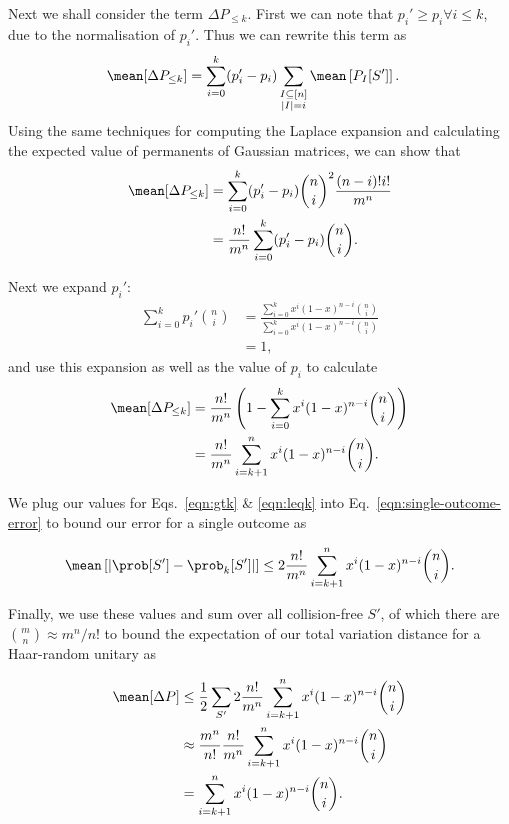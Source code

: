 Next we shall consider the term $\Delta P_{\leq k}$. 
First we can note that $p_i' \geq p_i \forall i\leq k$, due to the normalisation of $p_i'$. 
Thus we can rewrite this term as
\begin{align}
\mean[\Delta P_{\leq k}] &= \sum_{i=0}^k(p_i'-p_i)\sum_{\substack{I\subseteq[n]\\|I|=i}}\mean\left[P_I[S']\right].
\end{align}
Using the same techniques for computing the Laplace expansion and calculating the expected value of permanents of Gaussian matrices, we can show that
\begin{align}
\mean[\Delta P_{\leq k}] &= \sum_{i=0}^k(p_i'-p_i)\binom{n}{i}^2\frac{(n-i)!i!}{m^n}\\
&= \frac{n!}{m^n}\sum_{i=0}^k(p_i'-p_i)\binom{n}{i}\label{eqn:gtk}.
\end{align}

Next we expand $p_i'$:
\begin{align}
\sum_{i=0}^kp_i'\binom{n}{i} &= \frac{\sum_{i=0}^kx^i(1-x)^{n-i}\binom{n}{i}}{\sum_{i=0}^kx^i(1-x)^{n-i}\binom{n}{i}}\\
&= 1,
\end{align}
and use this expansion as well as the value of $p_i$ to calculate
\begin{align}
\mean[\Delta P_{\leq k}] &= \frac{n!}{m^n}\left(1 - \sum_{i=0}^kx^i(1-x)^{n-i}\binom{n}{i}\right)\\
&= \frac{n!}{m^n}\sum_{i=k+1}^nx^i(1-x)^{n-i}\binom{n}{i}\label{eqn:leqk}.
\end{align}

We plug our values for Eqs.\ \ref{eqn:gtk} \& \ref{eqn:leqk} into Eq.\ \ref{eqn:single-outcome-error} to bound our error for a single outcome as

\begin{equation}
\mean\left[|\prob[S']-\prob_k[S']|\right] \leq 2\frac{n!}{m^n}\sum_{i=k+1}^nx^i(1-x)^{n-i}\binom{n}{i}.
\end{equation}

Finally, we use these values and sum over all collision-free $S'$, of which there are $\binom{m}{n}\approx m^n/n!$ to bound the expectation of our total variation distance for a Haar-random unitary as

\begin{align}
\mean[\Delta P] &\leq \frac{1}{2}\sum_{S'}2\frac{n!}{m^n}\sum_{i=k+1}^nx^i(1-x)^{n-i}\binom{n}{i}\\
&\approx \frac{m^n}{n!}\frac{n!}{m^n}\sum_{i=k+1}^nx^i(1-x)^{n-i}\binom{n}{i}\\
&=\sum_{i=k+1}^nx^i(1-x)^{n-i}\binom{n}{i}.
\end{align}

